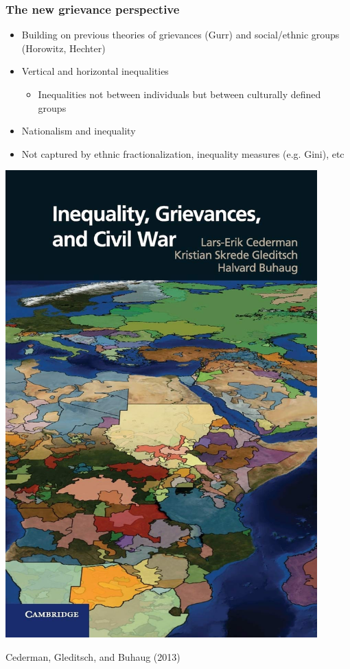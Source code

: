\documentclass[utf8, xcolor=dvipsnames]{beamer}
\begin{document}
\begin{frame}
\frametitle{The new grievance perspective}
\centering

\begin{minipage}{0.6\textwidth}\centering
  \begin{itemize}[<+->]
    \item Building on previous theories of grievances (Gurr) and social/ethnic groups (Horowitz, Hechter)
    \item Vertical and horizontal inequalities
    \begin{itemize}
      \item Inequalities not between individuals but between culturally defined groups
    \end{itemize}
    \item Nationalism and inequality
    \item Not captured by ethnic fractionalization, inequality measures (e.g. Gini), etc
  \end{itemize}
\end{minipage}\hfill
\begin{minipage}{0.39\textwidth}\centering
\includegraphics[width = 0.9\textwidth]{img/cgb}

{\small Cederman, Gleditsch, and Buhaug (2013)}
\end{minipage}

\end{frame}
\end{document}
